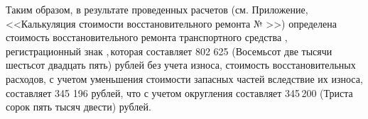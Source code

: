 %
\par Таким образом, в результате проведенных расчетов (см. Приложение, <<Калькуляция стоимости восстановительного ремонта № \NomerDoc>>) определена стоимость восстановительного ремонта транспортного средства  , регистрационный  знак ,\,которая составляет 802 625 (Восемьсот две тысячи шестьсот двадцать пять) рублей без учета износа, стоимость восстановительных расходов, с учетом уменьшения стоимости запасных частей вследствие их износа,  составляет 345 196 рублей, что с учетом округления составляет 345\,200 (Триста сорок пять тысяч двести) рублей.




